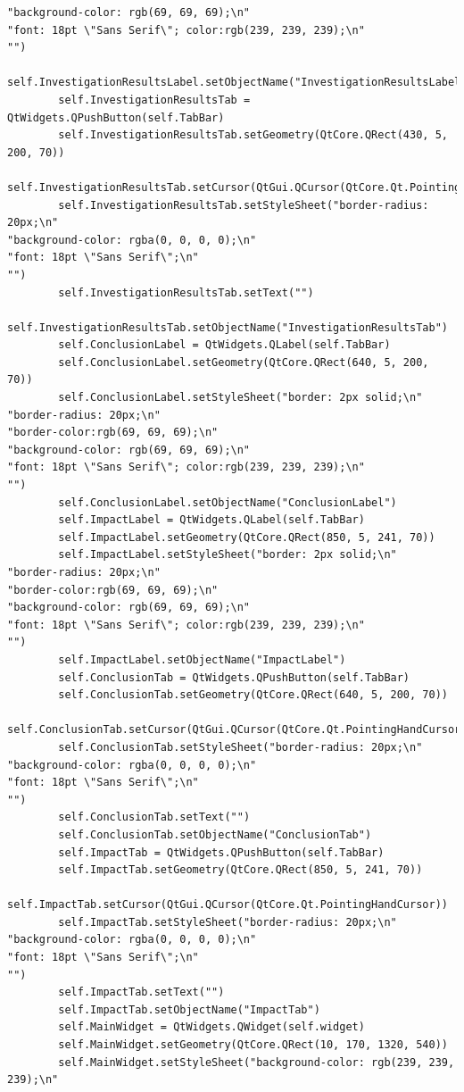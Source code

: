 \documentclass[12pt]{article}
\begin{document}
\begin{lstlisting}
"background-color: rgb(69, 69, 69);\n"
"font: 18pt \"Sans Serif\"; color:rgb(239, 239, 239);\n"
"")
        self.InvestigationResultsLabel.setObjectName("InvestigationResultsLabel")
        self.InvestigationResultsTab = QtWidgets.QPushButton(self.TabBar)
        self.InvestigationResultsTab.setGeometry(QtCore.QRect(430, 5, 200, 70))
        self.InvestigationResultsTab.setCursor(QtGui.QCursor(QtCore.Qt.PointingHandCursor))
        self.InvestigationResultsTab.setStyleSheet("border-radius: 20px;\n"
"background-color: rgba(0, 0, 0, 0);\n"
"font: 18pt \"Sans Serif\";\n"
"")
        self.InvestigationResultsTab.setText("")
        self.InvestigationResultsTab.setObjectName("InvestigationResultsTab")
        self.ConclusionLabel = QtWidgets.QLabel(self.TabBar)
        self.ConclusionLabel.setGeometry(QtCore.QRect(640, 5, 200, 70))
        self.ConclusionLabel.setStyleSheet("border: 2px solid;\n"
"border-radius: 20px;\n"
"border-color:rgb(69, 69, 69);\n"
"background-color: rgb(69, 69, 69);\n"
"font: 18pt \"Sans Serif\"; color:rgb(239, 239, 239);\n"
"")
        self.ConclusionLabel.setObjectName("ConclusionLabel")
        self.ImpactLabel = QtWidgets.QLabel(self.TabBar)
        self.ImpactLabel.setGeometry(QtCore.QRect(850, 5, 241, 70))
        self.ImpactLabel.setStyleSheet("border: 2px solid;\n"
"border-radius: 20px;\n"
"border-color:rgb(69, 69, 69);\n"
"background-color: rgb(69, 69, 69);\n"
"font: 18pt \"Sans Serif\"; color:rgb(239, 239, 239);\n"
"")
        self.ImpactLabel.setObjectName("ImpactLabel")
        self.ConclusionTab = QtWidgets.QPushButton(self.TabBar)
        self.ConclusionTab.setGeometry(QtCore.QRect(640, 5, 200, 70))
        self.ConclusionTab.setCursor(QtGui.QCursor(QtCore.Qt.PointingHandCursor))
        self.ConclusionTab.setStyleSheet("border-radius: 20px;\n"
"background-color: rgba(0, 0, 0, 0);\n"
"font: 18pt \"Sans Serif\";\n"
"")
        self.ConclusionTab.setText("")
        self.ConclusionTab.setObjectName("ConclusionTab")
        self.ImpactTab = QtWidgets.QPushButton(self.TabBar)
        self.ImpactTab.setGeometry(QtCore.QRect(850, 5, 241, 70))
        self.ImpactTab.setCursor(QtGui.QCursor(QtCore.Qt.PointingHandCursor))
        self.ImpactTab.setStyleSheet("border-radius: 20px;\n"
"background-color: rgba(0, 0, 0, 0);\n"
"font: 18pt \"Sans Serif\";\n"
"")
        self.ImpactTab.setText("")
        self.ImpactTab.setObjectName("ImpactTab")
        self.MainWidget = QtWidgets.QWidget(self.widget)
        self.MainWidget.setGeometry(QtCore.QRect(10, 170, 1320, 540))
        self.MainWidget.setStyleSheet("background-color: rgb(239, 239, 239);\n"

\end{lstlisting}
\end{document}
